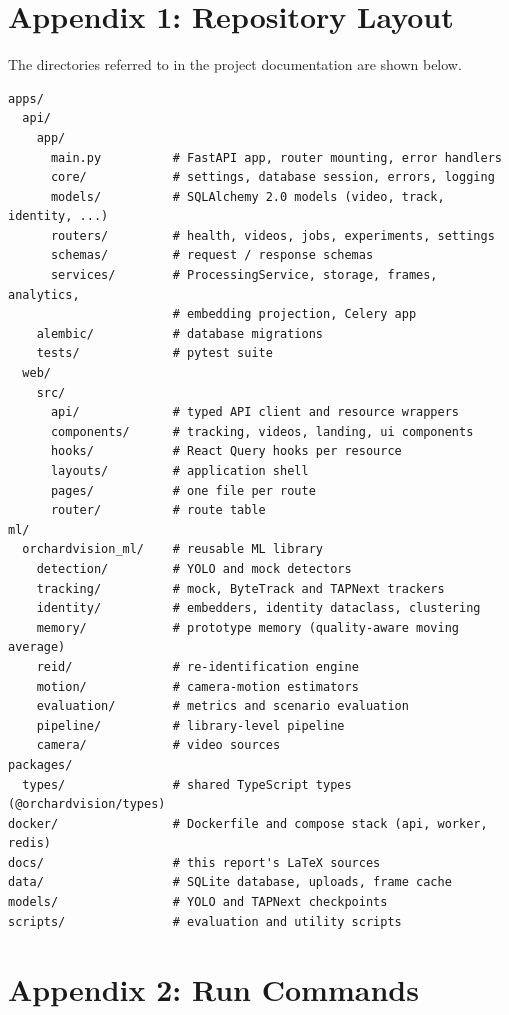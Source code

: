 \clearpage
\chapter*{Appendix 1: Repository Layout}

The directories referred to in the project documentation are shown below.

\begin{lstlisting}[style=plain]
apps/
  api/
    app/
      main.py          # FastAPI app, router mounting, error handlers
      core/            # settings, database session, errors, logging
      models/          # SQLAlchemy 2.0 models (video, track, identity, ...)
      routers/         # health, videos, jobs, experiments, settings
      schemas/         # request / response schemas
      services/        # ProcessingService, storage, frames, analytics,
                       # embedding projection, Celery app
    alembic/           # database migrations
    tests/             # pytest suite
  web/
    src/
      api/             # typed API client and resource wrappers
      components/      # tracking, videos, landing, ui components
      hooks/           # React Query hooks per resource
      layouts/         # application shell
      pages/           # one file per route
      router/          # route table
ml/
  orchardvision_ml/    # reusable ML library
    detection/         # YOLO and mock detectors
    tracking/          # mock, ByteTrack and TAPNext trackers
    identity/          # embedders, identity dataclass, clustering
    memory/            # prototype memory (quality-aware moving average)
    reid/              # re-identification engine
    motion/            # camera-motion estimators
    evaluation/        # metrics and scenario evaluation
    pipeline/          # library-level pipeline
    camera/            # video sources
packages/
  types/               # shared TypeScript types (@orchardvision/types)
docker/                # Dockerfile and compose stack (api, worker, redis)
docs/                  # this report's LaTeX sources
data/                  # SQLite database, uploads, frame cache
models/                # YOLO and TAPNext checkpoints
scripts/               # evaluation and utility scripts
\end{lstlisting}

\chapter*{Appendix 2: Run Commands}

